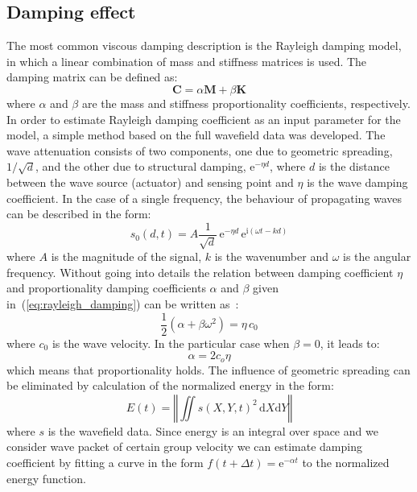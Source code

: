 \documentclass[12pt]{iopart}
\newcommand{\ud}{\mathrm{d}}
\newcommand{\bm}[1]{\mathbf{#1}}
\begin{document}
\subsection{Damping effect \label{sec:damping}}
The most common viscous damping description is the Rayleigh damping model, in which a linear combination of mass and stiffness matrices is used. The  damping matrix can be defined as:
\begin{equation}
\bm{C}= \alpha \bm{M} + \beta \bm{K}
\label{eq:rayleigh_damping}
\end{equation}
where \(\alpha\) and \(\beta\) are the mass and stiffness proportionality coefficients, respectively. 
In order to estimate Rayleigh damping coefficient as an input parameter for the model, a simple method based on the full wavefield data was developed. 
The wave attenuation consists of two components, one due to geometric spreading, \(1/\sqrt d\), and the other due to structural damping, \(\mathrm{e}^{-\eta d}\), where \(d\) is the distance between the wave source (actuator) and sensing point and \(\eta\) is the wave damping coefficient. 
In the case of a single frequency, the behaviour of propagating waves can be described in the form:
\begin{equation}
s_0(d,t) = A \frac{1}{\sqrt d} \,\mathrm{e}^{-\eta d} \, \mathrm{e}^{\mathrm{i} \left( \omega t - k d \right)}
\end{equation}
where \(A\) is the magnitude of the signal, \(k\) is the wavenumber and \(\omega\) is the angular frequency. 
Without going into details the relation between damping coefficient \(\eta\) and proportionality damping coefficients \(\alpha\) and \(\beta\) given in~(\ref{eq:rayleigh_damping}) can be written as~\cite{Gresil2015}:
\begin{equation}
\frac{1}{2} \left( \alpha + \beta \omega^2 \right) = \eta \, c_0
\end{equation} 
where \(c_0\) is the wave velocity. In the particular case when \(\beta = 0\), it leads to:
\begin{equation}
\alpha = 2 c_o \eta
\label{eq:alpha_prop}
\end{equation}
which means that proportionality holds.
The influence of geometric spreading can be eliminated by calculation of the normalized energy in the form:
\begin{equation}
E(t) = \left\Vert \iint  s(X,Y,t)^2 \, \ud X \ud Y \right\Vert
\label{eq:energy}
\end{equation}
where \(s\) is the wavefield data. 
Since energy is an integral over space and we consider wave packet of certain group velocity we can estimate damping coefficient by fitting a curve in the form \(f(t+\Delta t) = \mathrm{e}^{-\alpha t}\) to the normalized energy function.
\end{document}
